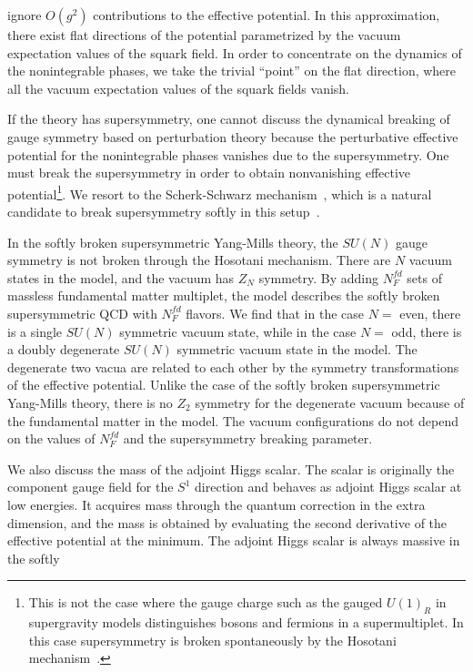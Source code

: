 \documentclass[a4paper,12pt]{article}
\begin{document}
ignore $O(g^2)$ contributions to the effective potential. 
In this approximation, there exist flat directions of the potential 
parametrized by the vacuum expectation values of the squark field. 
In order to concentrate on the dynamics of the
nonintegrable phases, we take the trivial ``point'' on the flat 
direction, where all the vacuum expectation values of the squark fields
vanish.
\par
If the theory has supersymmetry, one cannot discuss the dynamical breaking
of gauge symmetry based on perturbation theory because 
the perturbative effective potential for the nonintegrable
phases vanishes due to the supersymmetry. One must break the
supersymmetry in order to obtain nonvanishing effective 
potential\footnote{This is not the case where the gauge charge such 
as the gauged $U(1)_R$ in supergravity models
distinguishes bosons and fermions in a supermultiplet. 
In this case supersymmetry is broken spontaneously by the 
Hosotani mechanism~\cite{riotto}.}. We resort to the Scherk-Schwarz 
mechanism~\cite{ss, fi}, which is a natural candidate to 
break supersymmetry softly in this setup~\cite{takenagac}.
\par
In the softly broken supersymmetric Yang-Mills theory, the $SU(N)$ gauge
symmetry is not broken through the Hosotani mechanism. There are $N$ vacuum
states in the model, and the vacuum has $Z_N$ symmetry. By adding 
$N_F^{fd}$ sets of massless fundamental matter multiplet, the model 
describes the softly broken supersymmetric QCD with $N_F^{fd}$ flavors.
We find that in the case $N=$ even, there is a single $SU(N)$ symmetric 
vacuum state, while in the case $N=$ odd, there 
is a doubly degenerate $SU(N)$ symmetric vacuum state in the model. 
The degenerate two vacua are related to each other by the symmetry
transformations of the effective potential.
Unlike the case of the softly broken supersymmetric Yang-Mills theory,
there is no $Z_2$ symmetry for the degenerate vacuum 
because of the fundamental matter in the model.
The vacuum configurations do not depend on 
the values of $N_F^{fd}$ and the supersymmetry breaking parameter.
\par
We also discuss the mass of the adjoint Higgs scalar. The scalar 
is originally the component gauge field
for the $S^1$ direction and behaves as adjoint Higgs scalar at low energies. 
It acquires mass through the quantum correction in the extra 
dimension, and the mass is
obtained by evaluating the second derivative of the effective potential
at the minimum. 
The adjoint Higgs scalar is always massive in the softly 
\end{document}
